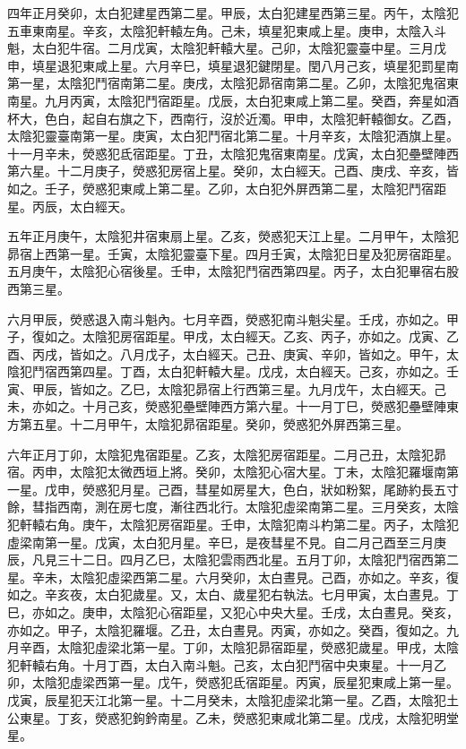\begin{pinyinscope}
 四年正月癸卯，太白犯建星西第二星。甲辰，太白犯建星西第三星。丙午，太陰犯五車東南星。辛亥，太陰犯軒轅左角。己未，填星犯東咸上星。庚申，太陰入斗魁，太白犯牛宿。二月戊寅，太陰犯軒轅大星。己卯，太陰犯靈臺中星。三月戊申，填星退犯東咸上星。六月辛巳，填星退犯鍵閉星。閏八月己亥，填星犯罰星南第一星，太陰犯鬥宿南第二星。庚戌，太陰犯昴宿南第二星。乙卯，太陰犯鬼宿東南星。九月丙寅，太陰犯鬥宿距星。戊辰，太白犯東咸上第二星。癸酉，奔星如酒杯大，色白，起自右旗之下，西南行，沒於近濁。甲申，太陰犯軒轅御女。乙酉，太陰犯靈臺南第一星。庚寅，太白犯鬥宿北第二星。十月辛亥，太陰犯酒旗上星。十一月辛未，熒惑犯氐宿距星。丁丑，太陰犯鬼宿東南星。戊寅，太白犯壘壁陣西第六星。十二月庚子，熒惑犯房宿上星。癸卯，太白經天。己酉、庚戌、辛亥，皆如之。壬子，熒惑犯東咸上第二星。乙卯，太白犯外屏西第二星，太陰犯鬥宿距星。丙辰，太白經天。



 五年正月庚午，太陰犯井宿東扇上星。乙亥，熒惑犯天江上星。二月甲午，太陰犯昴宿上西第一星。壬寅，太陰犯靈臺下星。四月壬寅，太陰犯日星及犯房宿距星。五月庚午，太陰犯心宿後星。壬申，太陰犯鬥宿西第四星。丙子，太白犯畢宿右股西第三星。



 六月甲辰，熒惑退入南斗魁內。七月辛酉，熒惑犯南斗魁尖星。壬戌，亦如之。甲子，復如之。太陰犯房宿距星。甲戌，太白經天。乙亥、丙子，亦如之。戊寅、乙酉、丙戌，皆如之。八月戊子，太白經天。己丑、庚寅、辛卯，皆如之。甲午，太陰犯鬥宿西第四星。丁酉，太白犯軒轅大星。戊戌，太白經天。己亥，亦如之。壬寅、甲辰，皆如之。乙巳，太陰犯昴宿上行西第三星。九月戊午，太白經天。己未，亦如之。十月己亥，熒惑犯壘壁陣西方第六星。十一月丁巳，熒惑犯壘壁陣東方第五星。十二月甲午，太陰犯昴宿距星。癸卯，熒惑犯外屏西第三星。



 六年正月丁卯，太陰犯鬼宿距星。乙亥，太陰犯房宿距星。二月己丑，太陰犯昴宿。丙申，太陰犯太微西垣上將。癸卯，太陰犯心宿大星。丁未，太陰犯羅堰南第一星。戊申，熒惑犯月星。己酉，彗星如房星大，色白，狀如粉絮，尾跡約長五寸餘，彗指西南，測在房七度，漸往西北行。太陰犯虛梁南第二星。三月癸亥，太陰犯軒轅右角。庚午，太陰犯房宿距星。壬申，太陰犯南斗杓第二星。丙子，太陰犯虛梁南第一星。戊寅，太白犯月星。辛巳，是夜彗星不見。自二月己酉至三月庚辰，凡見三十二日。四月乙巳，太陰犯雲雨西北星。五月丁卯，太陰犯鬥宿西第二星。辛未，太陰犯虛梁西第二星。六月癸卯，太白晝見。己酉，亦如之。辛亥，復如之。辛亥夜，太白犯歲星。又，太白、歲星犯右執法。七月甲寅，太白晝見。丁巳，亦如之。庚申，太陰犯心宿距星，又犯心中央大星。壬戌，太白晝見。癸亥，亦如之。甲子，太陰犯羅堰。乙丑，太白晝見。丙寅，亦如之。癸酉，復如之。九月辛酉，太陰犯虛梁北第一星。丁卯，太陰犯昴宿距星，熒惑犯歲星。甲戌，太陰犯軒轅右角。十月丁酉，太白入南斗魁。己亥，太白犯鬥宿中央東星。十一月乙卯，太陰犯虛梁西第一星。戊午，熒惑犯氐宿距星。丙寅，辰星犯東咸上第一星。戊寅，辰星犯天江北第一星。十二月癸未，太陰犯虛梁北第一星。乙酉，太陰犯土公東星。丁亥，熒惑犯鉤鈐南星。乙未，熒惑犯東咸北第二星。戊戌，太陰犯明堂星。




\end{pinyinscope}
